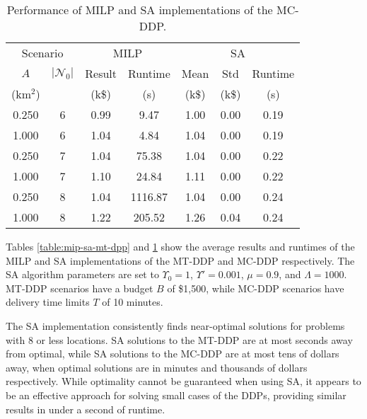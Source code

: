 \documentclass[journal]{IEEEtran}
\begin{document}
\begin{table}[t!]        
\caption{Performance of MILP and SA implementations of the MC-DDP.}                                                
\label{table:mip-sa-mc-dpp}                                               
\centering                                                              
\begin{tabular}{|c c|c c|c c c|}                                        
\hline                                                                  
\multicolumn{2}{|c|}{Scenario} & \multicolumn{2}{c|}{MILP} & \multicolumn{3}{c|}{SA} \\
${\ensuremath{A}}$ & $|{\ensuremath{{\ensuremath{\mathcal{N}}}_{0}}}{}|$ & Result & Runtime & Mean & Std & Runtime \\
(km$^2$) &  & (k\$) & (s) & (k\$) & (k\$) & (s) \\
\hline
0.250 & 6 & 0.99 & 9.47 & 1.00 & 0.00 & 0.19 \\   
1.000 & 6 & 1.04 & 4.84 & 1.04 & 0.00 & 0.19 \\   
0.250 & 7 & 1.04 & 75.38 & 1.04 & 0.00 & 0.22 \\  
1.000 & 7 & 1.10 & 24.84 & 1.11 & 0.00 & 0.22 \\  
0.250 & 8 & 1.04 & 1116.87 & 1.04 & 0.00 & 0.24 \\
1.000 & 8 & 1.22 & 205.52 & 1.26 & 0.04 & 0.24 \\ 
\hline
\end{tabular}                                                                                                        
\end{table}

Tables \ref{table:mip-sa-mt-dpp} and \ref{table:mip-sa-mc-dpp} show the average results and runtimes of the MILP and SA implementations of the MT-DDP and MC-DDP respectively. The SA algorithm parameters are set to ${\ensuremath{{\ensuremath{\Upsilon}}_0}}=1$, ${\ensuremath{{\ensuremath{\Upsilon}}'}}=0.001$, ${\ensuremath{\mu}}=0.9$, and ${\ensuremath{\Lambda}}=1000$. MT-DDP scenarios have a budget ${\ensuremath{B}}$ of \$1,500, while MC-DDP scenarios have delivery time limits ${\ensuremath{T}}$ of 10 minutes.

The SA implementation consistently finds near-optimal solutions for problems with 8 or less locations. SA solutions to the MT-DDP are at most seconds away from optimal, while SA solutions to the MC-DDP are at most tens of dollars away, when optimal solutions are in minutes and thousands of dollars respectively. While optimality cannot be guaranteed when using SA, it appears to be an effective approach for solving small cases of the DDPs, providing similar results in under a second of runtime.
\end{document}
